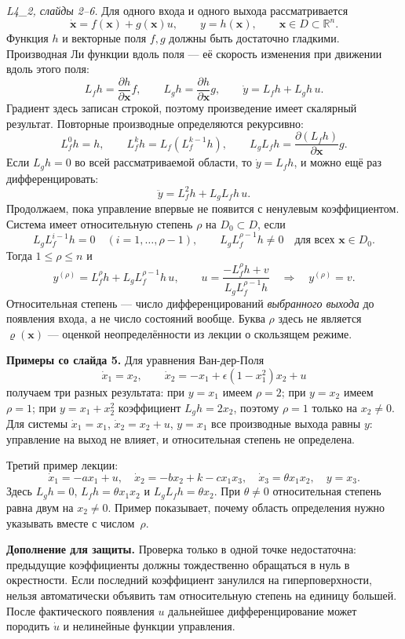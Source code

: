 \textit{L4\_2, слайды 2--6.}
Для одного входа и одного выхода рассматривается
\[
 \dot{\bm x}=f(\bm x)+g(\bm x)u,\qquad y=h(\bm x),
 \qquad \bm x\in D\subset\mathbb R^n.
\]
Функция $h$ и векторные поля $f,g$ должны быть достаточно гладкими.
Производная Ли функции вдоль поля --- её скорость изменения при
движении вдоль этого поля:
\[
 L_fh=\frac{\partial h}{\partial\bm x}f,
 \qquad L_gh=\frac{\partial h}{\partial\bm x}g,
 \qquad \dot y=L_fh+L_gh\,u.
\]
Градиент здесь записан строкой, поэтому произведение имеет скалярный
результат. Повторные производные определяются рекурсивно:
\[
 L_f^0h=h,\qquad L_f^kh=L_f(L_f^{k-1}h),\qquad
 L_gL_fh=\frac{\partial(L_fh)}{\partial\bm x}g.
\]
Если $L_gh=0$ во всей рассматриваемой области, то $\dot y=L_fh$,
и можно ещё раз дифференцировать:
\[
 \ddot y=L_f^2h+L_gL_fh\,u.
\]
Продолжаем, пока управление впервые не появится с ненулевым
коэффициентом. Система имеет относительную степень $\rho$ на
$D_0\subset D$, если
\[
 L_gL_f^{i-1}h=0\quad (i=1,\ldots,\rho-1),\qquad
 L_gL_f^{\rho-1}h\ne0\quad \text{для всех }\bm x\in D_0.
\]
Тогда $1\le\rho\le n$ и
\[
 y^{(\rho)}=L_f^\rho h+L_gL_f^{\rho-1}h\,u,
 \qquad
 \boxed{u=\frac{-L_f^\rho h+v}{L_gL_f^{\rho-1}h}}
 \quad\Longrightarrow\quad y^{(\rho)}=v.
\]
Относительная степень --- число дифференцирований \emph{выбранного
выхода} до появления входа, а не число состояний вообще.
Буква $\rho$ здесь не является $\varrho(\bm x)$ --- оценкой
неопределённости из лекции о скользящем режиме.

\textbf{Примеры со слайда 5.} Для уравнения Ван-дер-Поля
\[
 \dot x_1=x_2,\qquad
 \dot x_2=-x_1+\epsilon(1-x_1^2)x_2+u
\]
получаем три разных результата: при $y=x_1$ имеем $\rho=2$;
при $y=x_2$ имеем $\rho=1$; при $y=x_1+x_2^2$ коэффициент
$L_gh=2x_2$, поэтому $\rho=1$ только на $x_2\ne0$.
Для системы $\dot x_1=x_1$, $\dot x_2=x_2+u$, $y=x_1$
все производные выхода равны $y$: управление на выход не влияет,
и относительная степень не определена.

Третий пример лекции:
\[
 \dot x_1=-ax_1+u,\quad
 \dot x_2=-bx_2+k-cx_1x_3,\quad
 \dot x_3=\theta x_1x_2,\quad y=x_3.
\]
Здесь $L_gh=0$, $L_fh=\theta x_1x_2$ и
$L_gL_fh=\theta x_2$. При $\theta\ne0$ относительная степень
равна двум на $x_2\ne0$. Пример показывает, почему область
определения нужно указывать вместе с числом~$\rho$.

\textbf{Дополнение для защиты.} Проверка только в одной точке
недостаточна: предыдущие коэффициенты должны тождественно обращаться
в нуль в окрестности. Если последний коэффициент занулился на
гиперповерхности, нельзя автоматически объявить там относительную
степень на единицу большей. После фактического появления $u$
дальнейшее дифференцирование может породить $\dot u$ и нелинейные
функции управления.

